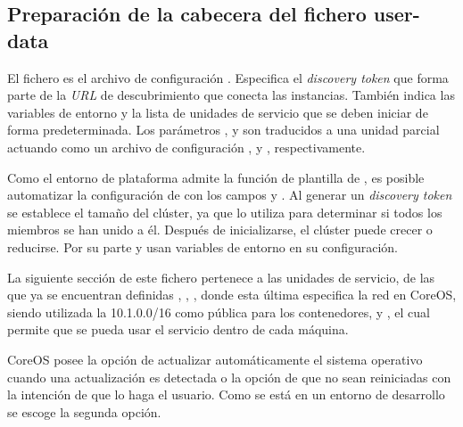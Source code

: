 \subsection{Preparación de la cabecera del fichero user-data}

El fichero  es el archivo de configuración . Especifica el \textit{discovery token} que forma parte de la \textit{URL} de descubrimiento que conecta las instancias. También indica las variables de entorno y la lista de unidades de servicio que se deben iniciar de forma predeterminada. Los parámetros ,  y  son traducidos a una unidad  parcial actuando como un archivo de configuración ,  y , respectivamente. 

Como el entorno de plataforma admite la función de plantilla de , es posible automatizar la configuración de  con los campos  y . Al generar un \textit{discovery token} se establece el tamaño del clúster, ya que  lo utiliza para determinar si todos los miembros se han unido a él. Después de inicializarse, el clúster puede crecer o reducirse. Por su parte  y  usan variables de entorno en su configuración.

La siguiente sección de este fichero pertenece a las unidades de servicio, de las que ya se encuentran definidas , , , donde esta última especifica la red en CoreOS, siendo utilizada la 10.1.0.0/16 como pública para los contenedores, y , el cual permite que se pueda usar el servicio  dentro de cada máquina.

CoreOS posee la opción de actualizar automáticamente el sistema operativo cuando una actualización es detectada o la opción de que no sean reiniciadas con la intención de que lo haga el usuario. Como se está en un entorno de desarrollo se escoge la segunda opción.

